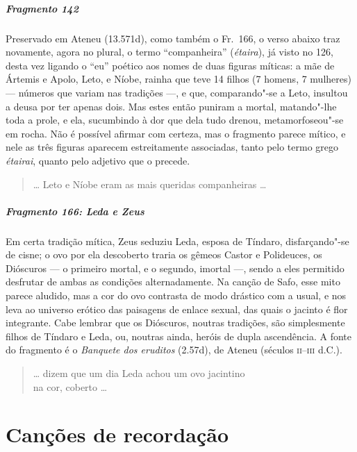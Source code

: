 \paragraph{Fragmento 142}

{\small Preservado em Ateneu (13.571d), como também o Fr.~166, o verso abaixo traz novamente,
agora no plural, o termo ``companheira” (\textit{étaira}), já visto no
126, desta vez ligando o “eu” poético aos nomes de duas figuras míticas: a mãe de
Ártemis e Apolo, Leto, e Níobe, rainha que teve 14 filhos (7 homens, 7
mulheres) --- números que variam nas tradições ---, e que, comparando"-se a Leto, insultou a deusa por ter apenas dois.
Mas estes então puniram a mortal, matando"-lhe toda a prole, e ela, sucumbindo à dor que dela tudo drenou, metamorfoseou"-se em rocha. Não é possível afirmar
com certeza, mas o fragmento parece mítico, e nele as três figuras aparecem
estreitamente associadas, tanto pelo termo grego \textit{étairai}, quanto pelo
adjetivo que o precede.}

\begin{verse}
\ldots{} Leto e Níobe eram as mais queridas \qb{}companheiras \ldots{}
\end{verse}


\paragraph{Fragmento 166: Leda e Zeus}

{\small Em certa tradição mítica, Zeus seduziu Leda, esposa de Tíndaro, disfarçando"-se
de cisne; o ovo por ela descoberto traria os gêmeos Castor e Polideuces, os
Dióscuros --- o primeiro mortal, e o segundo, imortal ---, sendo a eles
permitido desfrutar de ambas as condições alternadamente. Na canção de Safo,
esse mito parece aludido, mas a cor do ovo contrasta de modo drástico com a usual,
e nos leva ao universo erótico das paisagens de enlace sexual, das quais o
jacinto é flor integrante. Cabe lembrar que os Dióscuros, noutras tradições,
são simplesmente filhos de Tíndaro e Leda, ou, noutras ainda, heróis de dupla
ascendência. A fonte do fragmento é o \textit{Banquete dos eruditos} (2.57d), de Ateneu
(séculos \textsc{ii}--\textsc{iii} d.C.).}

\begin{verse}
\ldots{} dizem que um dia Leda achou um ovo \qb{}jacintino\\
na cor, coberto \ldots{}
\end{verse}


\chapter{Canções de recordação}

